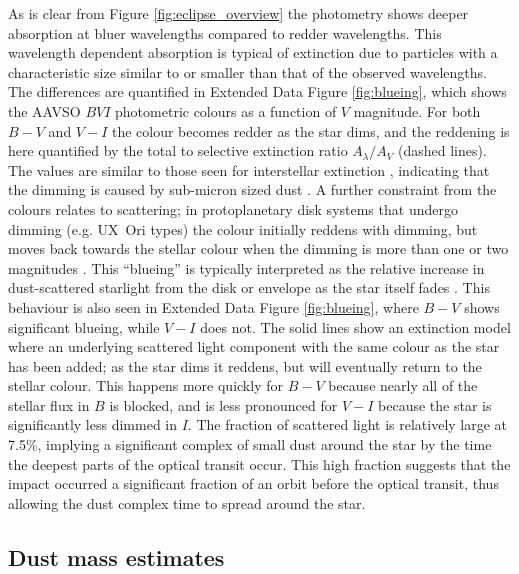 \documentclass[sn-nature,oneside]{sn-jnl}%
\begin{document}
As is clear from Figure \ref{fig:eclipse_overview} the photometry shows deeper absorption at bluer wavelengths compared to redder wavelengths.
%
This wavelength dependent absorption is typical of extinction due to particles with a characteristic size similar to or smaller than that of the observed wavelengths.
%
The differences are quantified in Extended Data Figure \ref{fig:blueing}, which shows the AAVSO $BVI$ photometric colours as a function of $V$ magnitude.
%
For both $B-V$ and $V-I$ the colour becomes redder as the star dims, and the reddening is here quantified by the total to selective extinction ratio $A_\lambda/A_V$ (dashed lines).
%
The values are similar to those seen for interstellar extinction \cite{1989ApJ...345..245C}, indicating that the dimming is caused by sub-micron sized dust \cite{1977ApJ...217..425M,2001ApJ...548..296W}.
%
A further constraint from the colours relates to scattering; in protoplanetary disk systems that undergo dimming (e.g. UX~Ori types) the colour initially reddens with dimming, but moves back towards the stellar colour when the dimming is more than one or two magnitudes \cite[e.g.][]{1994AJ....108.1906H}.
%
This ``blueing'' is typically interpreted as the relative increase in dust-scattered starlight from the disk or envelope as the star itself fades \cite{1988SvAL...14...27G}.
%
This behaviour is also seen in Extended Data Figure \ref{fig:blueing}, where $B-V$ shows significant blueing, while $V-I$ does not.
%
The solid lines show an extinction model where an underlying scattered light component with the same colour as the star has been added; as the star dims it reddens, but will eventually return to the stellar colour.
%
This happens more quickly for $B-V$ because nearly all of the stellar flux in $B$ is blocked, and is less pronounced for $V-I$ because the star is significantly less dimmed in $I$.
%
The fraction of scattered light is relatively large at 7.5\%, implying a significant complex of small dust around the star by the time the deepest parts of the optical transit occur.
%
This high fraction suggests that the impact occurred a significant fraction of an orbit before the optical transit, thus allowing the dust complex time to spread around the star.

\subsection*{Dust mass estimates}
\end{document}
